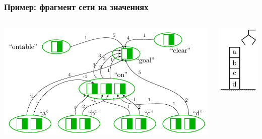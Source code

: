 \documentclass[default]{beamer}
\begin{document}
	\begin{frame}
		\frametitle{Пример: фрагмент сети на значениях}
		\begin{columns}
			\begin{column}{0.7\textwidth}
				\centering
				\includegraphics[page=5,width=\textwidth]{plan/plan_nets}
			\end{column}
			\begin{column}{0.3\textwidth}
				\centering
				\includegraphics[page=3,width=\textwidth]{plan/block_world}
			\end{column}
		\end{columns}
	\end{frame}
	
\end{document}

